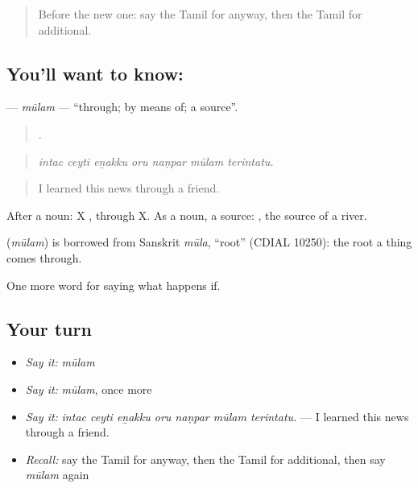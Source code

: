 \label{lesson:TA-C399-mulam}



\begin{quote}
Before the new one: say the Tamil for anyway, then the Tamil for additional.
\end{quote}

\subsection*{You'll want to know: }
\textbf{} — \emph{mūlam} — \textquotedblleft{}through; by means of; a source\textquotedblright{}.

\begin{quote}
      .
\end{quote}

\begin{quote}
\emph{intac ceyti eṉakku oru naṇpar mūlam terintatu.}
\end{quote}

\begin{quote}
I learned this news through a friend.
\end{quote}

After a noun: X , through X. As a noun, a source:  , the source of a river.

\begin{cousinweb}
\textbf{} (\emph{mūlam}) is borrowed from Sanskrit \emph{mūla}, \textquotedblleft{}root\textquotedblright{} (CDIAL 10250): the root a thing comes through.
\end{cousinweb}

\begin{grammarlens}[title={What you've built}]
One more word for saying what happens if.
\end{grammarlens}

\subsection*{Your turn}
\begin{itemize}
\raggedright
  \item \emph{Say it:} \emph{mūlam}
  \item \emph{Say it:} \emph{mūlam}, once more
  \item \emph{Say it:} \emph{intac ceyti eṉakku oru naṇpar mūlam terintatu.} — I learned this news through a friend.
  \item \emph{Recall:} say the Tamil for anyway, then the Tamil for additional, then say \emph{mūlam} again
\end{itemize}

